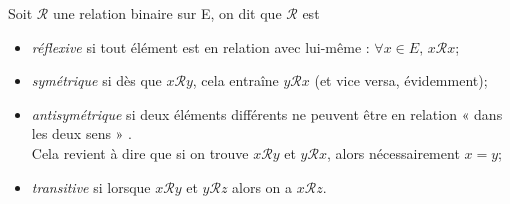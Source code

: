 \begin{definition}
    Soit $\mathcal{R}$ une relation binaire sur E, on dit que $\mathcal{R}$ est
    \begin{itemize}
        \item 	\textit{réflexive} si tout élément est en relation avec lui-même : $\forall x\in E,\, x\mathcal{R}x$;
        \item 	\textit{symétrique} si dès que $x\mathcal{R}y$, cela entraîne $y\mathcal{R}x$ (et vice versa, évidemment);
        \item 	\textit{antisymétrique} si deux éléments différents ne peuvent être en relation « dans les deux sens  » .\\
              Cela revient à dire que si on trouve $x\mathcal{R}y$ et $y\mathcal{R}x$, alors nécessairement $x=y$;
        \item 	\textit{transitive} si lorsque $x\mathcal{R}y$ et $y\mathcal{R}z$ alors on a $x\mathcal{R}z$.
    \end{itemize}
\end{definition}
